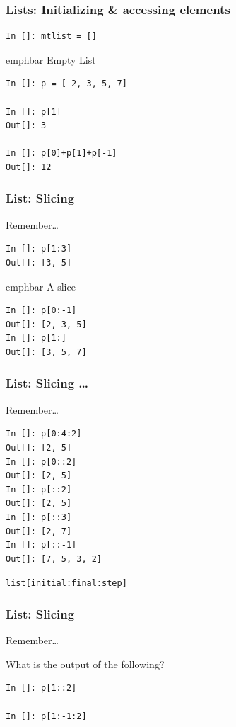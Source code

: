\documentclass[14pt,compress]{beamer}
\newcommand{\emphbar}[1]
{\begin{beamercolorbox}[rounded=true]{emphbar}
      {#1}
 \end{beamercolorbox}
}
\newcommand{\typ}[1]{\lstinline{#1}}
\newcommand{\kwrd}[1]{ \texttt{\textbf{\color{blue}{#1}}}  }
\begin{document}
\begin{frame}[fragile]
\frametitle{Lists: Initializing \& accessing elements}
\begin{lstlisting}
In []: mtlist = []
\end{lstlisting}
\emphbar{Empty List}
\begin{lstlisting}
In []: p = [ 2, 3, 5, 7]

In []: p[1]
Out[]: 3

In []: p[0]+p[1]+p[-1]
Out[]: 12
\end{lstlisting}
\end{frame}

\begin{frame}[fragile]
  \frametitle{List: Slicing}
  \begin{block}{Remember\ldots}
	\kwrd{In []: p = [ 2, 3, 5, 7]}
  \end{block}
\begin{lstlisting}
In []: p[1:3]
Out[]: [3, 5]
\end{lstlisting}
\emphbar{A slice}
\begin{lstlisting}
In []: p[0:-1]
Out[]: [2, 3, 5]
In []: p[1:]
Out[]: [3, 5, 7]
\end{lstlisting}
\end{frame}

\begin{frame}
  \frametitle{List: Slicing \ldots}
  \vspace*{-0.1in}
  \begin{small}
  \begin{block}{Remember\ldots}
	\kwrd{In []: p = [ 2, 3, 5, 7]}
\end{block}
\end{small}
\begin{lstlisting}
In []: p[0:4:2]
Out[]: [2, 5]
In []: p[0::2]
Out[]: [2, 5]
In []: p[::2]
Out[]: [2, 5]
In []: p[::3]
Out[]: [2, 7]
In []: p[::-1]
Out[]: [7, 5, 3, 2]
\end{lstlisting}
\alert{\typ{list[initial:final:step]}}
\end{frame}

\begin{frame}[fragile]
  \frametitle{List: Slicing}
  \begin{block}{Remember\ldots}
	\kwrd{In []: p = [ 2, 3, 5, 7]}
  \end{block}
  What is the output of the following?
\begin{lstlisting}
In []: p[1::2]

In []: p[1:-1:2]
\end{lstlisting}
\end{frame}
\end{document}
